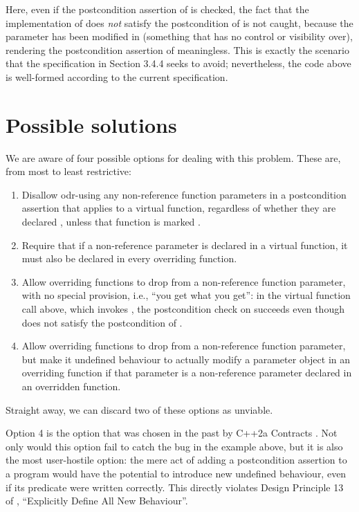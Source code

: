 \pagebreak %

Here, even if the postcondition assertion of  is checked, the fact that the implementation of  does \emph{not} satisfy the postcondition of  is not caught, because the parameter  has been modified in  (something that  has no control or visibility over), rendering the postcondition assertion of  meaningless. This is exactly the scenario that the specification in \cite{P2900R10} Section 3.4.4 seeks to avoid; nevertheless, the code above is well-formed according to the current specification.

\section{Possible solutions}

We are aware of four possible options for dealing with this problem. These are, from most to least restrictive:
\begin{enumerate}
\item Disallow odr-using any non-reference function parameters in a postcondition assertion that applies to a virtual function, regardless of whether they are declared , unless that function is marked .
\item Require that if a non-reference parameter is declared  in a virtual function, it must also be declared  in every overriding function.
\item Allow overriding functions to drop  from a non-reference function parameter, with no special provision, i.e., ``you get what you get'': in the virtual function call above, which invokes , the postcondition check on  succeeds even though  does not satisfy the postcondition of .
\item Allow overriding functions to drop  from a non-reference function parameter, but make it undefined behaviour to actually modify a parameter object in an overriding function if that parameter is a non-reference parameter declared  in an overridden function.
\end{enumerate}
Straight away, we can discard two of these options as unviable.

Option 4 is the option that was chosen in the past by C++2a Contracts \cite{P0542R5}. Not only would this option fail to catch the bug in the example above, but it is also the most user-hostile option: the mere act of adding a postcondition assertion to a program would have the potential to introduce new undefined behaviour, even if its predicate were written correctly. This directly violates Design Principle 13 of \cite{P2900R10}, ``Explicitly Define All New Behaviour''.

